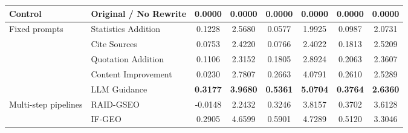 \begin{table}[t]
{\begin{tabular}{llcccccc}
      \midrule
      Control & Original / No Rewrite
        & 0.0000 & 0.0000 & 0.0000 & 0.0000 & 0.0000 & 0.0000 \\
      \midrule
      Fixed prompts & Statistics Addition
        & 0.1228 & 2.5680 & 0.0577 & 1.9925 & 0.0987 & 2.0731 \\
       & Cite Sources
        & 0.0753 & 2.4220 & 0.0766 & 2.4022 & 0.1813 & 2.5209 \\
       & Quotation Addition
        & 0.1106 & 2.3152 & 0.1805 & 2.8924 & 0.2063 & 2.3607 \\
       & Content Improvement
        & 0.0230 & 2.7807 & 0.2663 & 4.0791 & 0.2610 & 2.5289 \\
       & LLM Guidance
        & \textbf{0.3177} & \textbf{3.9680} & \textbf{0.5361} & \textbf{5.0704} & \textbf{0.3764} & \textbf{2.6360} \\
      \midrule
      Multi-step pipelines & RAID-GSEO
        & -0.0148 & 2.2432 & 0.3246 & 3.8157 & 0.3702 & 3.6128 \\
       & IF-GEO
        & 0.2905 & 4.6599 & 0.5901 & 4.7289 & 0.5120 & 3.3046 \\
      \bottomrule
    \end{tabular}%
  }
\end{table}
